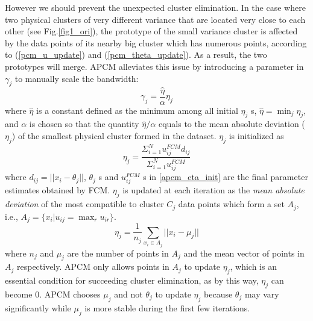 \documentclass[journal]{IEEEtran}
\begin{document}
However we should prevent the unexpected cluster elimination. In the case where two physical clusters of very different variance that are located very close to each other (see Fig.\ref{fig1_ori}), the prototype of the small variance cluster is affected by the data points of its nearby big cluster which has numerous points, according to (\ref{pcm_u_update}) and (\ref{pcm_theta_update}). As a result, the two prototypes will merge. APCM alleviates this issue by introducing a parameter in $\gamma_j$ to manually scale the bandwidth:
\begin{equation}
\label{corrected_eta}
\gamma_j=\frac{\hat{\eta}}{\alpha}\eta_j
\end{equation}
where $\hat{\eta}$ is a constant defined as the minimum among all initial $\eta_j$ s, $\hat{\eta}=\min_j\eta_j$, and $\alpha$ is chosen so that the quantity $\hat{\eta}/\alpha$ equals to the mean absolute deviation ($\eta_j$)  of the smallest physical cluster formed in the dataset. $\eta_j$ is initialized as
\begin{equation}
\label{apcm_eta_init}
\eta_j=\frac{\Sigma_{i=1}^Nu_{ij}^{FCM}d_{ij}}{\Sigma_{i=1}^Nu_{ij}^{FCM}}  
\end{equation}
where $d_{ij}=||x_i-\theta_j||$, $\theta_j$ s and $u_{ij}^{FCM}$ s in \ref{apcm_eta_init} are the final parameter estimates obtained by FCM. $\eta_j$ is updated at each iteration as the \emph{mean absolute deviation} of the most compatible to cluster $C_j$ data points which form a set $A_j$, i.e., $A_j=\{x_i|u_{ij}=\max_r u_{ir}\}$.
\begin{equation}
\label{apcm_eta_update}
\eta_j=\frac{1}{n_j}\sum_{x_i\in A_j}||x_i-\mu_j||
\end{equation}
where $n_j$ and $\mu_j$ are the number of points in $A_j$ and the mean vector of points in $A_j$ respectively. APCM only allows points in $A_j$ to update $\eta_j$, which is an essential condition for succeeding cluster elimination, as by this way, $\eta_j$ can become $0$. APCM chooses $\mu_j$ and not $\theta_j$ to update $\eta_j$ because $\theta_j$ may vary significantly while $\mu_j$ is more stable during the first few iterations.
\end{document}

